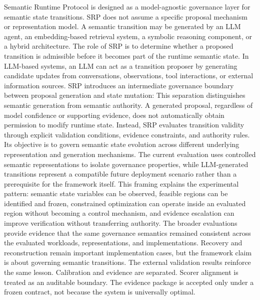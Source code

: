 {}Semantic Runtime Protocol is designed as a model-agnostic governance layer for semantic state transitions. SRP does not assume a specific proposal mechanism or representation model. A semantic transition may be generated by an LLM agent, an embedding-based retrieval system, a symbolic reasoning component, or a hybrid architecture. The role of SRP is to determine whether a proposed transition is admissible before it becomes part of the runtime semantic state.\markdownRendererParagraphSeparator
{}In LLM-based systems, an LLM can act as a transition proposer by generating candidate updates from conversations, observations, tool interactions, or external information sources. SRP introduces an intermediate governance boundary between proposal generation and state mutation:\markdownRendererInterblockSeparator
{}\markdownRendererInterblockSeparator
{}This separation distinguishes semantic generation from semantic authority. A generated proposal, regardless of model confidence or supporting evidence, does not automatically obtain permission to modify runtime state. Instead, SRP evaluates transition validity through explicit validation conditions, evidence constraints, and authority rules.\markdownRendererParagraphSeparator
{}Its objective is to govern semantic state evolution across different underlying representation and generation mechanisms. The current evaluation uses controlled semantic representations to isolate governance properties, while LLM-generated transitions represent a compatible future deployment scenario rather than a prerequisite for the framework itself.\markdownRendererParagraphSeparator
{}This framing explains the experimental pattern: semantic state variables can be observed, feasible regions can be identified and frozen, constrained optimization can operate inside an evaluated region without becoming a control mechanism, and evidence escalation can improve verification without transferring authority. The broader evaluations provide evidence that the same governance semantics remained consistent across the evaluated workloads, representations, and implementations. Recovery and reconstruction remain important implementation cases, but the framework claim is about governing semantic transitions.\markdownRendererParagraphSeparator
{}The external validation results reinforce the same lesson. Calibration and evidence are separated. Scorer alignment is treated as an auditable boundary. The evidence package is accepted only under a frozen contract, not because the system is universally optimal.\markdownRendererInterblockSeparator
